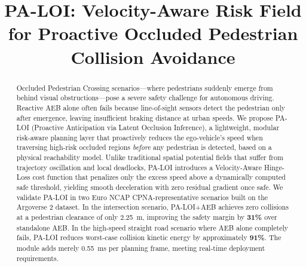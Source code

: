 \documentclass[conference]{IEEEtran}
\begin{document}
\title{\vspace{0.25in}PA-LOI: Velocity-Aware Risk Field for Proactive Occluded Pedestrian Collision Avoidance}

\author{
}

\maketitle

\begin{abstract}
Occluded Pedestrian Crossing scenarios---where pedestrians suddenly emerge from behind visual obstructions---pose a severe safety challenge for autonomous driving. Reactive AEB alone often fails because line-of-sight sensors detect the pedestrian only after emergence, leaving insufficient braking distance at urban speeds. We propose PA-LOI (Proactive Anticipation via Latent Occlusion Inference), a lightweight, modular risk-aware planning layer that proactively reduces the ego-vehicle's speed when traversing high-risk occluded regions \emph{before} any pedestrian is detected, based on a physical reachability model. Unlike traditional spatial potential fields that suffer from trajectory oscillation and local deadlocks, PA-LOI introduces a Velocity-Aware Hinge-Loss cost function that penalizes only the excess speed above a dynamically computed safe threshold, yielding smooth deceleration with zero residual gradient once safe. We validate PA-LOI in two Euro NCAP CPNA-representative scenarios built on the Argoverse 2 dataset. In the intersection scenario, PA-LOI+AEB achieves zero collisions at a pedestrian clearance of only \SI{2.25}{\meter}, improving the safety margin by \textbf{31\%} over standalone AEB. In the high-speed straight road scenario where AEB alone completely fails, PA-LOI reduces worst-case collision kinetic energy by approximately \textbf{91\%}. The module adds merely \SI{0.55}{\milli\second} per planning frame, meeting real-time deployment requirements.
\end{abstract}
\end{document}
